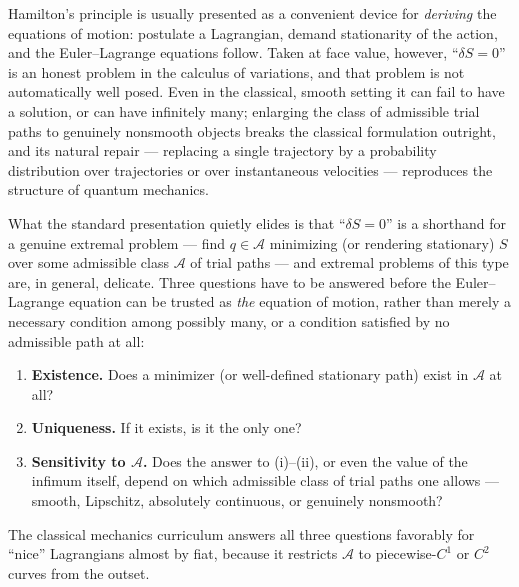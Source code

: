 Hamilton's principle is usually presented as a convenient device for
\emph{deriving} the equations of motion: postulate a Lagrangian, demand
stationarity of the action, and the Euler--Lagrange equations follow. Taken at
face value, however, ``$\delta S=0$'' is an honest problem in the calculus of
variations, and that problem is not automatically well posed. Even in the
classical, smooth setting it can fail to have a solution, or can have
infinitely many; enlarging the class of admissible trial paths to genuinely
nonsmooth objects breaks the classical formulation outright, and its natural
repair --- replacing a single trajectory by a probability distribution over
trajectories or over instantaneous velocities --- reproduces the structure of
quantum mechanics.


What the standard presentation quietly elides is that ``$\delta S=0$'' is a
shorthand for a genuine extremal problem --- find $q\in\mathcal{A}$ minimizing
(or rendering stationary) $S$ over some admissible class $\mathcal{A}$ of trial
paths --- and extremal problems of this type are, in general, delicate. Three
questions have to be answered before the Euler--Lagrange equation can be
trusted as \emph{the} equation of motion, rather than merely a necessary
condition among possibly many, or a condition satisfied by no admissible path
at all:
\begin{enumerate}
\item \textbf{Existence.} Does a minimizer (or well-defined stationary path)
    exist in $\mathcal{A}$ at all?
\item \textbf{Uniqueness.} If it exists, is it the only one?
\item \textbf{Sensitivity to $\mathcal{A}$.} Does the answer to (i)--(ii), or
    even the value of the infimum itself, depend on which admissible class of
        trial paths one allows --- smooth, Lipschitz, absolutely continuous, or
        genuinely nonsmooth?
\end{enumerate}
The classical mechanics curriculum answers all three questions favorably for
``nice'' Lagrangians almost by fiat, because it restricts $\mathcal{A}$ to
piecewise-$C^1$ or $C^2$ curves from the outset. 

